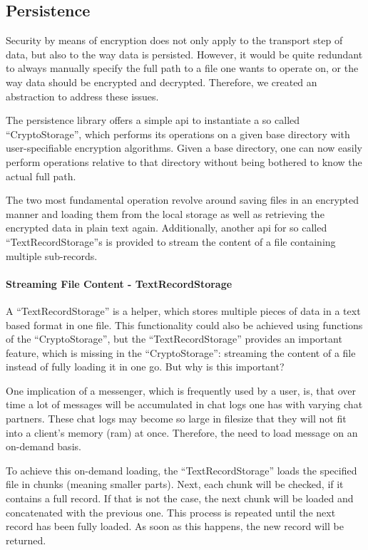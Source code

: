 \subsection{Persistence}\label{subsec:persistence}
Security by means of encryption does not only apply to the transport step of data, but also to the way data is
persisted.
However, it would be quite redundant to always manually specify the full path to a file one wants to operate on, or the
way data should be encrypted and decrypted.
Therefore, we created an abstraction to address these issues.

The persistence library offers a simple \ac{api} to instantiate a so called \enquote{CryptoStorage}, which performs its
operations on a given base directory with user-specifiable encryption algorithms.
Given a base directory, one can now easily perform operations relative to that directory without being bothered to know
the actual full path.

The two most fundamental operation revolve around saving files in an encrypted manner and loading them from the local
storage as well as retrieving the encrypted data in plain text again.
Additionally, another \ac{api} for so called \enquote{TextRecordStorage}s is provided to stream the content of a file
containing multiple sub-records.

\paragraph{Streaming File Content - TextRecordStorage}
A \enquote{TextRecordStorage} is a helper, which stores multiple pieces of data in a text based format in one file.
This functionality could also be achieved using functions of the \enquote{CryptoStorage}, but the
\enquote{TextRecordStorage} provides an important feature, which is missing in the \enquote{CryptoStorage}: streaming
the content of a file instead of fully loading it in one go.
But why is this important?

One implication of a messenger, which is frequently used by a user, is, that over time a lot of messages will be
accumulated in chat logs one has with varying chat partners.
These chat logs may become so large in filesize that they will not fit into a client's memory (\ac{ram}) at once.
Therefore, the need to load message on an on-demand basis.

To achieve this on-demand loading, the \enquote{TextRecordStorage} loads the specified file in chunks (meaning smaller
parts).
Next, each chunk will be checked, if it contains a full record.
If that is not the case, the next chunk will be loaded and concatenated with the previous one.
This process is repeated until the next record has been fully loaded.
As soon as this happens, the new record will be returned.

